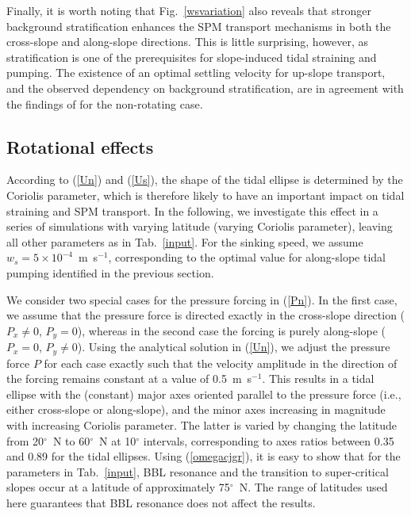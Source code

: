 Finally, it is worth noting that Fig.\ \ref{wsvariation} also reveals
that stronger background stratification enhances the SPM transport
mechanisms in both the cross-slope and along-slope directions. This is
little surprising, however, as stratification is one of the
prerequisites for slope-induced tidal straining and pumping. The
existence of an optimal settling velocity for up-slope transport, and
the observed dependency on background stratification, are in agreement
with the findings of \cite{schulzumlauf2016} for the non-rotating
case.



\subsection{Rotational effects}

According to (\ref{Un}) and (\ref{Us}), the shape of the tidal ellipse
is determined by the Coriolis parameter, which is therefore likely to
have an important impact on tidal straining and SPM transport. In the
following, we investigate this effect in a series of simulations with
varying latitude (varying Coriolis parameter), leaving all other
parameters as in Tab.\ \ref{input}. For the sinking speed, we assume
$w_s=5 \times 10^{-4}$~m~s$^{-1}$, corresponding to the optimal value
for along-slope tidal pumping identified in the previous section.

We consider two special cases for the pressure forcing in
(\ref{Pn}). In the first case, we assume that the pressure force is
directed exactly in the cross-slope direction ($P_x \neq 0$, $P_y=0$),
whereas in the second case the forcing is purely along-slope ($P_x =
0$, $P_y \neq 0$). Using the analytical solution in (\ref{Un}), we
adjust the pressure force $P$ for each case exactly such that the
velocity amplitude in the direction of the forcing remains constant at
a value of 0.5~m~s$^{-1}$. This results in a tidal ellipse with the
(constant) major axes oriented parallel to the pressure force (i.e.,
either cross-slope or along-slope), and the minor axes increasing in
magnitude with increasing Coriolis parameter. The latter is varied by
changing the latitude from 20$^\circ$~N to 60$^\circ$~N at 10$^\circ$
intervals, corresponding to axes ratios between 0.35 and 0.89 for the
tidal ellipses.  Using (\ref{omegacjgr}), it is easy to show that for the
parameters in Tab.\ \ref{input}, BBL resonance and the transition to
super-critical slopes \citep[see][]{schulzumlauf2016} occur at a
latitude of approximately 75$^\circ$~N. The range of latitudes used
here guarantees that BBL resonance does not affect the results.


